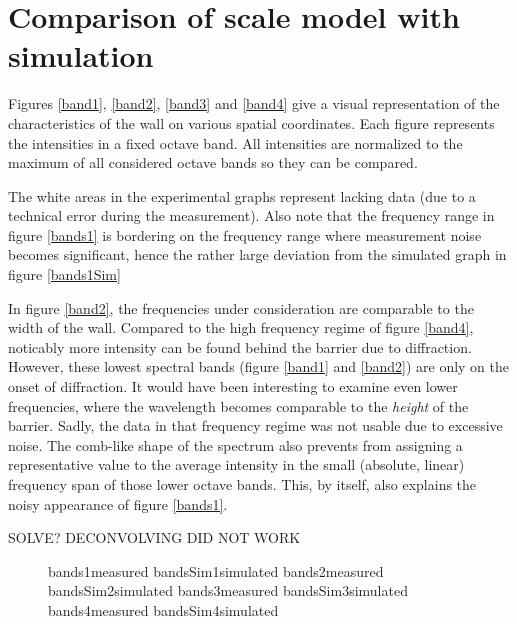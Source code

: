 \section{Comparison of scale model with simulation \label{sectComparison}}
Figures \ref{band1}, \ref{band2}, \ref{band3} and \ref{band4} give a visual representation of the characteristics of the wall on various spatial coordinates. Each figure represents the intensities in a fixed octave band. All intensities are normalized to the maximum of all considered octave bands so they can be compared.

The white areas in the experimental graphs represent lacking data (due to a technical error during the measurement). Also note that the frequency range in figure \ref{bands1} is bordering on the frequency range where measurement noise becomes significant, hence the rather large deviation from the simulated graph in figure \ref{bands1Sim}

In figure \ref{band2}, the frequencies under consideration are comparable to the width of the wall. Compared to the high frequency regime of figure \ref{band4}, noticably more intensity can be found behind the barrier due to diffraction. However, these lowest spectral bands (figure \ref{band1} and \ref{band2}) are only on the onset of diffraction. It would have been interesting to examine even lower frequencies, where the wavelength becomes comparable to the \emph{height} of the barrier. Sadly, the data in that frequency regime was not usable due to excessive noise. The comb-like shape of the spectrum also prevents from assigning a representative value to the average intensity in the small (absolute, linear) frequency span of those lower octave bands. This, by itself, also explains the noisy appearance of figure \ref{bands1}.

SOLVE?
DECONVOLVING DID NOT WORK






\begin{figure}
	{bands1}{measured}
	{bandsSim1}{simulated}
	{bands2}{measured}
	{bandsSim2}{simulated}
	{bands3}{measured}
	{bandsSim3}{simulated}
	{bands4}{measured}
	{bandsSim4}{simulated}
\end{figure}




